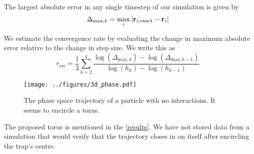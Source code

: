 The largest absolute error in any single timestep of our simulation is given by
\begin{equation}
  \Delta_{\text{max}, k} = \max_i |\bold{r}_{i,\text{exact}} - \bold{r}_i|
\end{equation}

We estimate the convergence rate by evaluating the change in maximum absolute error
relative to the change in step size. We write this as
\begin{equation}
  r_{\text{err}} = \frac{1}{3}\sum_{k=2}^4\frac{\log(\Delta_{\text{max}, k}) - \log(\Delta_{\text{max}, k-1})}{\log{(h_k)} - \log(h_{k-1})}
\end{equation}

\begin{figure}
  \centering
  \texttt{[image: ../figures/3d\_phase.pdf]}
  \caption{The phase space trajectory of a particle with no interactions. It seems
    to encircle a torus.}
\label{fig:torus}
\end{figure}


The proposed torus is mentioned in the \autoref{results}. We have not stored data from a simulation
that would verify that the trajectory closes in on itself after encircling the trap's centre.
